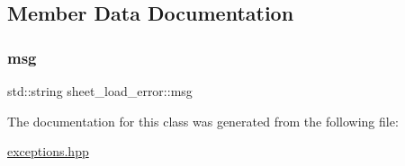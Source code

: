\subsection{Member Data Documentation}
\mbox{\label{classsheet__load__error_ace61b8fa1d457fc96a3edd2e354f0b1a}} 
\subsubsection{\texorpdfstring{msg}{msg}}
{\footnotesize\ttfamily std\+::string sheet\+\_\+load\+\_\+error\+::msg\hspace{0.3cm}{\ttfamily [private]}}



The documentation for this class was generated from the following file\+:\begin{DoxyCompactItemize}
\item 
\hyperlink{exceptions_8hpp}{exceptions.\+hpp}\end{DoxyCompactItemize}
